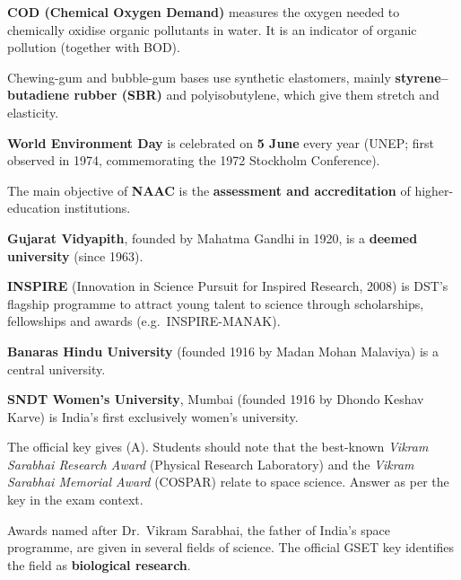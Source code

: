 \textbf{COD (Chemical Oxygen Demand)} measures the oxygen needed to chemically oxidise organic pollutants in water. It is an indicator of organic pollution (together with BOD).

Chewing-gum and bubble-gum bases use synthetic elastomers, mainly \textbf{styrene--butadiene rubber (SBR)} and polyisobutylene, which give them stretch and elasticity.

\textbf{World Environment Day} is celebrated on \textbf{5 June} every year (UNEP; first observed in 1974, commemorating the 1972 Stockholm Conference).

The main objective of \textbf{NAAC} is the \textbf{assessment and accreditation} of higher-education institutions.

\textbf{Gujarat Vidyapith}, founded by Mahatma Gandhi in 1920, is a \textbf{deemed university} (since 1963).

\textbf{INSPIRE} (Innovation in Science Pursuit for Inspired Research, 2008) is DST's flagship programme to attract young talent to science through scholarships, fellowships and awards (e.g.\ INSPIRE-MANAK).

\textbf{Banaras Hindu University} (founded 1916 by Madan Mohan Malaviya) is a central university.

\textbf{SNDT Women's University}, Mumbai (founded 1916 by Dhondo Keshav Karve) is India's first exclusively women's university.

The official key gives (A). Students should note that the best-known \emph{Vikram Sarabhai Research Award} (Physical Research Laboratory) and the \emph{Vikram Sarabhai Memorial Award} (COSPAR) relate to space science. Answer as per the key in the exam context.

Awards named after Dr.~Vikram Sarabhai, the father of India's space programme, are given in several fields of science. The official GSET key identifies the field as \textbf{biological research}.
